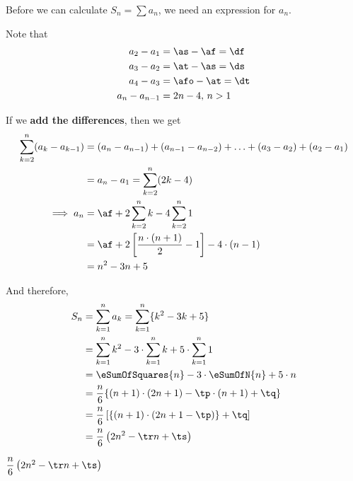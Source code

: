 \begin{solution}[\halfpage]
  Before we can calculate $S_n=\sum a_n$, we need an expression for $a_n$. 

  Note that
  \begin{align}
    a_2 - a_1 &= \as-\af=\df \\
    a_3 - a_2 &= \at-\as=\ds \\
    a_4-a_3 &= \afo-\at = \dt \\
    a_n - a_{n-1} &= \vj n - \vk,\, n > 1 \\
  \end{align}

  If we \textbf{add the differences}, then we get 
  \begin{align}
    \sum_{k=2}^n (a_k - a_{k-1}) &= (a_n-a_{n-1}) + (a_{n-1}-a_{n-2}) + \ldots + (a_3-a_2) + (a_2-a_1)  \\
     &= a_n-a_1 = \sum_{k=2}^n (\vj k - \vk) \\
     \implies a_n &= \af + \vj\sum_{k=2}^n k -\vk\sum_{k=2}^n 1 \\
                  &= \af + 2\left[ \dfrac{n\cdot (n+1)}{2} - 1\right] - \vk\cdot( n - 1) \\
                  &= n^2-\va n + \vb
  \end{align}
  
  And therefore,
	\begin{align}
		S_n &= \sum_{k=1}^{n}a_k = \sum_{k=1}^{n}\lbrace k^2 - \va k + \vb \rbrace \\
		&= \sum_{k=1}^{n}k^2 - \va\cdot\sum_{k=1}^{n}k + \vb\cdot\sum_{k=1}^{n}1 \\
		&= \eSumOfSquares{n} - \va\cdot\eSumOfN{n} + \vb\cdot n \\
    &= \dfrac{n}{6}\lbrace (n+1)\cdot(2n+1) - \tp\cdot(n+1) + \tq \rbrace \\
    &= \dfrac{n}{6}\left[ \lbrace (n+1)\cdot(2n + 1 - \tp)\rbrace + \tq \right] \\
    &= \dfrac{n}{6}\left( 2n^2 - \tr n + \ts \right)
	\end{align}
\end{solution}
\ifprintanswers
  \begin{codex}
    $\dfrac{n}{6}\left( 2n^2 - \tr n + \ts \right)$
  \end{codex}
\fi
